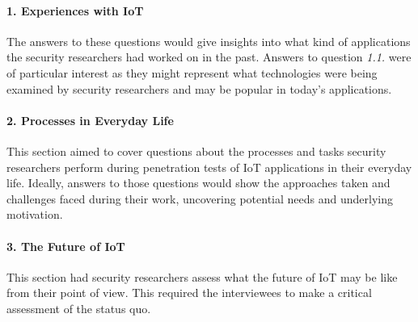 \paragraph{1. Experiences with IoT} The answers to these questions would give insights into what kind of applications the security researchers had worked on in the past. Answers to question \emph{1.1.} were of particular interest as they might represent what technologies were being examined by security researchers and may be popular in today’s applications.
\paragraph{2. Processes in Everyday Life} This section aimed to cover questions about the processes and tasks security researchers perform during penetration tests of IoT applications in their everyday life. Ideally, answers to those questions would show the approaches taken and challenges faced during their work, uncovering potential needs and underlying motivation.
\paragraph{3. The Future of IoT} This section had security researchers assess what the future of IoT may be like from their point of view. This required the interviewees to make a critical assessment of the status quo.



